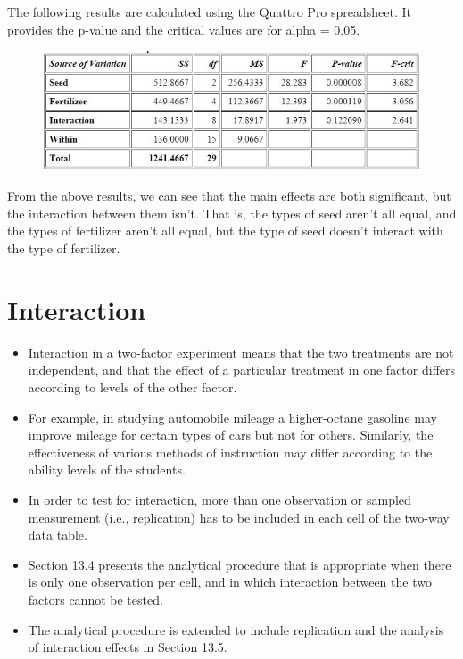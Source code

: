 \documentclass[]{article}
\begin{document}
The following results are calculated using the Quattro Pro spreadsheet. It provides the p-value and the critical values are for alpha = 0.05.
\begin{figure}
\centering
\includegraphics[width=0.7\linewidth]{QuattroPro}
\caption{}
\label{fig:QuattroPro}
\end{figure}
 	 	 
From the above results, we can see that the main effects are both significant, but the interaction between them isn't. That is, the types of seed aren't all equal, and the types of fertilizer aren't all equal, but the type of seed doesn't interact with the type of fertilizer.



\section{Interaction}
\begin{itemize}
\item Interaction in a two-factor experiment means that the two treatments are not independent, and that the
effect of a particular treatment in one factor differs according to levels of the other factor. 
\item For example, in
studying automobile mileage a higher-octane gasoline may improve mileage for certain types of cars but not for
others. Similarly, the effectiveness of various methods of instruction may differ according to the ability levels of
the students. 
\item In order to test for interaction, more than one observation or sampled measurement (i.e.,
replication) has to be included in each cell of the two-way data table. 
\item Section 13.4 presents the analytical
procedure that is appropriate when there is only one observation per cell, and in which interaction between the
two factors cannot be tested. 
\item The analytical procedure is extended to include replication and the analysis of
interaction effects in Section 13.5.
\end{itemize}

\newpage
\end{document}
